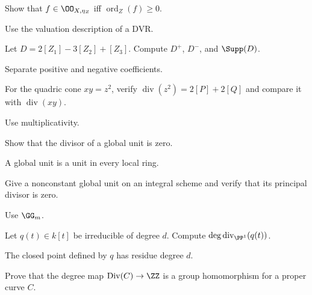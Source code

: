 \fi
\begin{exercise}\label{exr:vi39-13}
Show that \(f\in\OO_{X,\eta_Z}\) iff \(\operatorname{ord}_Z(f)\ge0\).
\end{exercise}
\ifdefined\IncludeExerciseHints
\begin{hint}
Use the valuation description of a DVR.
\end{hint}
\fi
\begin{exercise}\label{exr:vi39-14}
Let \(D=2[Z_1]-3[Z_2]+[Z_3]\).  Compute \(D^+\), \(D^-\), and \(\Supp(D)\).
\end{exercise}
\ifdefined\IncludeExerciseHints
\begin{hint}
Separate positive and negative coefficients.
\end{hint}
\fi
\begin{exercise}\label{exr:vi39-15}
For the quadric cone \(xy=z^2\), verify \(\operatorname{div}(z^2)=2[P]+2[Q]\) and compare it with \(\operatorname{div}(xy)\).
\end{exercise}
\ifdefined\IncludeExerciseHints
\begin{hint}
Use multiplicativity.
\end{hint}
\fi
\begin{exercise}\label{exr:vi39-16}
Show that the divisor of a global unit is zero.
\end{exercise}
\ifdefined\IncludeExerciseHints
\begin{hint}
A global unit is a unit in every local ring.
\end{hint}
\fi
\begin{exercise}\label{exr:vi39-17}
Give a nonconstant global unit on an integral scheme and verify that its principal divisor is zero.
\end{exercise}
\ifdefined\IncludeExerciseHints
\begin{hint}
Use \(\GG_m\).
\end{hint}
\fi
\begin{exercise}\label{exr:vi39-18}
Let \(q(t)\in k[t]\) be irreducible of degree \(d\).  Compute \(\deg\operatorname{div}_{\PP^1}(q(t))\).
\end{exercise}
\ifdefined\IncludeExerciseHints
\begin{hint}
The closed point defined by \(q\) has residue degree \(d\).
\end{hint}
\fi
\begin{exercise}\label{exr:vi39-19}
Prove that the degree map \(\Div(C)\to\ZZ\) is a group homomorphism for a proper curve \(C\).
\end{exercise}
